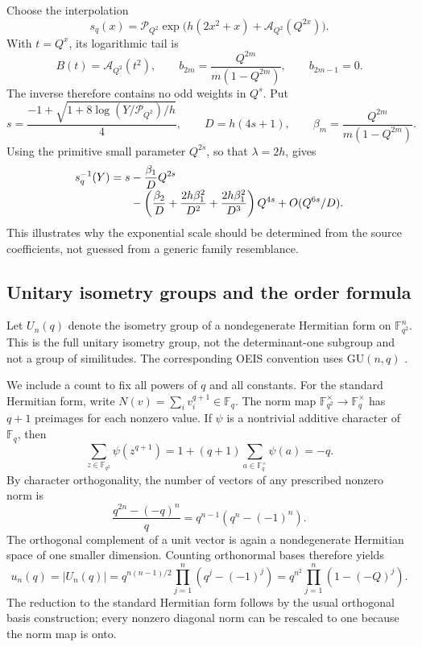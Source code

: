 \documentclass[11pt]{article}
\numberwithin{equation}{section}
\theoremstyle{definition}
\newcommand{\F}{\mathbb F}
\begin{document}
Choose the interpolation
\begin{equation}\label{eq:Sp-interp}
 s_q(x)=\mathcal P_{Q^2}
   \exp\bigl(h(2x^2+x)+\mathcal A_{Q^2}(Q^{2x})\bigr).
\end{equation}
With $t=Q^x$, its logarithmic tail is
\begin{equation}\label{eq:Sp-B}
 B(t)=\mathcal A_{Q^2}(t^2),\qquad
 b_{2m}=\frac{Q^{2m}}{m(1-Q^{2m})},\qquad b_{2m-1}=0.
\end{equation}
The inverse therefore contains no odd weights in $Q^s$. Put
\begin{equation}\label{eq:Sp-center}
 s=\frac{-1+\sqrt{1+8\log(Y/\mathcal P_{Q^2})/h}}4,
 \qquad D=h(4s+1),\qquad \beta_m=\frac{Q^{2m}}{m(1-Q^{2m})}.
\end{equation}
Using the primitive small parameter $Q^{2s}$, so that $\lambda=2h$, gives
\begin{align}\label{eq:Sp-inverse}
 s_q^{-1}(Y)=s
 &-\frac{\beta_1}{D}Q^{2s}\\[-0.3em]
 &-\left(\frac{\beta_2}{D}
       +\frac{2h\beta_1^2}{D^2}
       +\frac{2h\beta_1^2}{D^3}\right)Q^{4s}
 +O(Q^{6s}/D).\notag
\end{align}
This illustrates why the exponential scale should be determined from the source coefficients, not guessed from a generic family resemblance.

\subsection{Unitary isometry groups and the order formula}

Let $U_n(q)$ denote the isometry group of a nondegenerate Hermitian form on $\F_{q^2}^n$. This is the full unitary isometry group, not the determinant-one subgroup and not a group of similitudes. The corresponding OEIS convention uses $\mathrm{GU}(n,q)$ \cite{oeisU}.

We include a count to fix all powers of $q$ and all constants. For the standard Hermitian form, write $N(v)=\sum_i v_i^{q+1}\in\F_q$. The norm map $\F_{q^2}^{\times}\to\F_q^{\times}$ has $q+1$ preimages for each nonzero value. If $\psi$ is a nontrivial additive character of $\F_q$, then
\[
 \sum_{z\in\F_{q^2}}\psi(z^{q+1})
 =1+(q+1)\sum_{a\in\F_q^{\times}}\psi(a)=-q.
\]
By character orthogonality, the number of vectors of any prescribed nonzero norm is
\begin{equation}\label{eq:unitnorm}
 \frac{q^{2n}-(-q)^n}{q}=q^{n-1}(q^n-(-1)^n).
\end{equation}
The orthogonal complement of a unit vector is again a nondegenerate Hermitian space of one smaller dimension. Counting orthonormal bases therefore yields
\begin{equation}\label{eq:U-count}
 u_n(q)=|U_n(q)|
 =q^{n(n-1)/2}\prod_{j=1}^n(q^j-(-1)^j)
 =q^{n^2}\prod_{j=1}^n(1-(-Q)^j).
\end{equation}
The reduction to the standard Hermitian form follows by the usual orthogonal basis construction; every nonzero diagonal norm can be rescaled to one because the norm map is onto.
\end{document}
